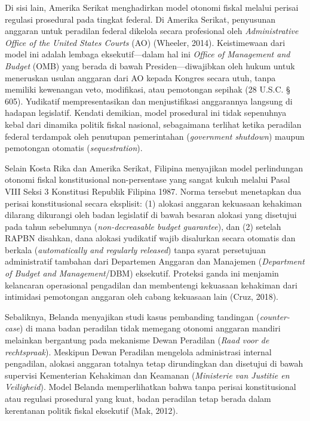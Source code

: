 \documentclass[12pt, a4paper]{article}
\begin{document}
Di sisi lain, Amerika Serikat menghadirkan model otonomi fiskal melalui perisai regulasi prosedural pada tingkat federal. Di Amerika Serikat, penyusunan anggaran untuk peradilan federal dikelola secara profesional oleh \textit{Ad\-mi\-nis\-tra\-tive Office of the United States Courts} (AO) (Wheeler, 2014). Keistimewaan dari model ini adalah lembaga eksekutif---dalam hal ini \textit{Office of Management and Budget} (OMB) yang berada di bawah Presiden---diwajibkan oleh hukum untuk meneruskan usulan anggaran dari AO kepada Kongres secara utuh, tanpa memiliki kewenangan veto, modifikasi, atau pemotongan sepihak (28 U.S.C. § 605). Yudikatif mempresentasikan dan menjustifikasi anggarannya langsung di hadapan legislatif. Kendati demikian, model prosedural ini tidak sepenuhnya kebal dari dinamika politik fiskal nasional, sebagaimana terlihat ketika peradilan federal terdampak oleh penutupan pemerintahan (\textit{government shutdown}) maupun pemotongan otomatis (\textit{sequestration}).

Selain Kosta Rika dan Amerika Serikat, Filipina menyajikan model perlindungan otonomi fiskal konstitusional non-persentase yang sangat kukuh melalui Pasal VIII Seksi 3 Konstitusi Republik Filipina 1987. Norma tersebut menetapkan dua perisai konstitusional secara eksplisit: (1) alokasi anggaran kekuasaan kehakiman dilarang dikurangi oleh badan legislatif di bawah besaran alokasi yang disetujui pada tahun sebelumnya (\textit{non-decreasable budget guarantee}), dan (2) setelah RAPBN disahkan, dana alokasi yudikatif wajib disalurkan secara otomatis dan berkala (\textit{automatically and regularly released}) tanpa syarat persetujuan administratif tambahan dari Departemen Anggaran dan Manajemen (\textit{Department of Budget and Management}/DBM) eksekutif. Proteksi ganda ini menjamin kelancaran operasional pengadilan dan membentengi kekuasaan kehakiman dari intimidasi pemotongan anggaran oleh cabang kekuasaan lain (Cruz, 2018).

Sebaliknya, Belanda menyajikan studi kasus pembanding tandingan (\textit{counter-case}) di mana badan peradilan tidak memegang otonomi anggaran mandiri melainkan bergantung pada mekanisme Dewan Peradilan (\textit{Raad voor de rechtspraak}). Meskipun Dewan Peradilan mengelola administrasi internal pengadilan, alokasi anggaran totalnya tetap dirundingkan dan disetujui di bawah supervisi Kementerian Kehakiman dan Keamanan (\textit{Ministerie van Justitie en Veiligheid}). Model Belanda memperlihatkan bahwa tanpa perisai konstitusional atau regulasi prosedural yang kuat, badan peradilan tetap berada dalam kerentanan politik fiskal eksekutif (Mak, 2012).
\end{document}
